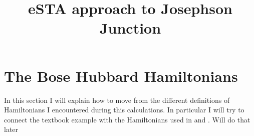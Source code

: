 \documentclass{article}
\title{eSTA approach to Josephson Junction}
\date{}
\author{}
\begin{document}
  
\maketitle
\section{The Bose Hubbard Hamiltonians}
In this section I will explain how to  move from the different definitions of Hamiltonians I encountered during this calculations. In particular I will try to connect the textbook example with the Hamiltonians used in \cite{FastGenerationJulia2012} and \cite{BoseEinsteinCJulia2010}.
Will do that later 
 





\end{document}
